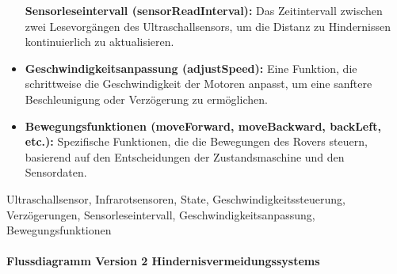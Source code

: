 \documentclass{vorlage-design-main}
\begin{document}
\begin{itemize}
  \textbf{Sensorleseintervall (sensorReadInterval):} Das Zeitintervall
  zwischen zwei Lesevorgängen des Ultraschallsensors, um die Distanz zu
  Hindernissen kontinuierlich zu aktualisieren.
\item
  \textbf{Geschwindigkeitsanpassung (adjustSpeed):} Eine Funktion, die
  schrittweise die Geschwindigkeit der Motoren anpasst, um eine sanftere
  Beschleunigung oder Verzögerung zu ermöglichen.
\item
  \textbf{Bewegungsfunktionen (moveForward, moveBackward, backLeft,
  etc.):} Spezifische Funktionen, die die Bewegungen des Rovers steuern,
  basierend auf den Entscheidungen der Zustandsmaschine und den
  Sensordaten.
\end{itemize}

Ultraschallsensor, Infrarotsensoren, State, Geschwindigkeitssteuerung,
Verzögerungen, Sensorleseintervall, Geschwindigkeitsanpassung,
Bewegungsfunktionen

\newpage

\hypertarget{flussdiagramm-version-2-hindernisvermeidungssystems}{%
\paragraph{Flussdiagramm Version 2
Hindernisvermeidungssystems}\label{flussdiagramm-version-2-hindernisvermeidungssystems}}
\end{document}
